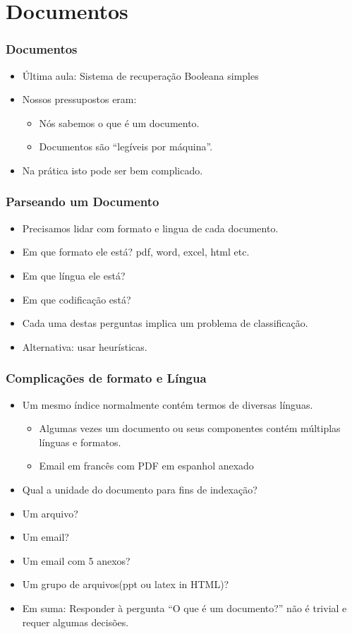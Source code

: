 \documentclass[compress]{beamer}
\begin{document}
\section{Documentos}
\begin{frame}
\frametitle{Documentos}
\begin{itemize}[<+->]
\item Última aula: Sistema de recuperação Booleana simples
\item Nossos pressupostos eram:
\begin{itemize}[<+->]
\item Nós sabemos o que é um documento.
\item Documentos são ``legíveis por máquina''.
\end{itemize}
\item Na prática isto pode ser bem complicado.
\end{itemize}
\end{frame}

\begin{frame}
\frametitle{Parseando um Documento}
\begin{itemize}[<+->]
\item Precisamos lidar com formato e lingua de cada documento.
\item Em que formato ele está? pdf, word, excel, html etc.
\item Em que língua ele está?
\item Em que codificação está?
\item Cada uma destas perguntas implica um problema de 
classificação.
\item Alternativa: usar heurísticas.
\end{itemize}
\end{frame}

\begin{frame}
\frametitle{Complicações de formato e Língua}
\begin{itemize}[<+->]
\item Um mesmo índice normalmente contém termos de diversas línguas.
\begin{itemize}[<+->]
\item Algumas vezes um documento ou seus componentes contém múltiplas 
línguas e formatos.
\item Email em francês com PDF em espanhol anexado
\end{itemize}
\item Qual a unidade do documento para fins de indexação?
\item Um arquivo?
\item Um email?
\item Um email com 5 anexos?
\item Um grupo de arquivos(ppt ou latex in HTML)?
\item Em suma: Responder à pergunta ``O que é um documento?''
  não é trivial e requer algumas decisões.
\end{itemize}
\end{frame}
\end{document}
